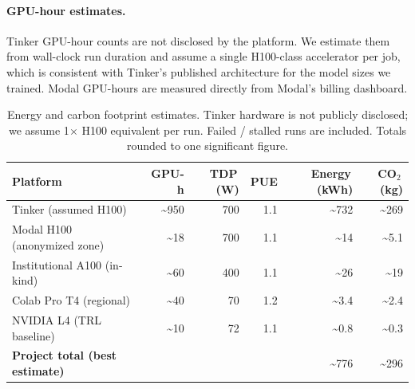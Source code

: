 \documentclass{article}
\begin{document}
\paragraph{GPU-hour estimates.}
Tinker GPU-hour counts are not disclosed by the platform. We estimate them
from wall-clock run duration and assume a single H100-class accelerator per
job, which is consistent with Tinker's published architecture for the
model sizes we trained. Modal GPU-hours are measured directly from Modal's
billing dashboard.

\begin{table}[ht]
\centering
\small
\caption{Energy and carbon footprint estimates. Tinker hardware is not
publicly disclosed; we assume 1$\times$ H100 equivalent per run. Failed /
stalled runs are included. Totals rounded to one significant figure.}
\label{tab:carbon2}
\begin{tabular}{lrrrrr}
\toprule
\textbf{Platform} & \textbf{GPU-h} & \textbf{TDP\,(W)} & \textbf{PUE} &
\textbf{Energy\,(kWh)} & \textbf{CO$_2$\,(kg)} \\
\midrule
Tinker (assumed H100)   & \textasciitilde 950 & 700 & 1.1 & \textasciitilde 732 & \textasciitilde 269 \\
Modal H100 (anonymized zone)    & \textasciitilde 18  & 700 & 1.1 & \textasciitilde 14  & \textasciitilde 5.1 \\
Institutional A100 (in-kind)      & \textasciitilde 60  & 400 & 1.1 & \textasciitilde 26  & \textasciitilde 19   \\
Colab Pro T4 (regional)    & \textasciitilde 40 & 70 & 1.2 & \textasciitilde 3.4 & \textasciitilde 2.4  \\
NVIDIA L4 (TRL baseline)   & \textasciitilde 10 & 72 & 1.1 & \textasciitilde 0.8 & \textasciitilde 0.3  \\
\midrule
\textbf{Project total (best estimate)} & & & & \textasciitilde 776 & \textasciitilde 296 \\
\bottomrule
\end{tabular}
\end{table}
\end{document}
